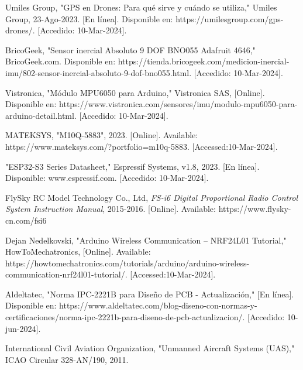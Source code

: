 \documentclass[journal,onecolumn]{IEEEtran}
\begin{document}
\begin{thebibliography}{20}
Umiles Group, "GPS en Drones: Para qué sirve y cuándo se utiliza," Umiles Group, 23-Ago-2023. [En línea]. Disponible en: https://umilesgroup.com/gps-drones/. [Accedido: 10-Mar-2024].

BricoGeek, "Sensor inercial Absoluto 9 DOF BNO055 Adafruit 4646," BricoGeek.com. Disponible en: https://tienda.bricogeek.com/medicion-inercial-imu/802-sensor-inercial-absoluto-9-dof-bno055.html. [Accedido: 10-Mar-2024].

Vistronica, "Módulo MPU6050 para Arduino," Vistronica SAS, [Online]. Disponible en: https://www.vistronica.com/sensores/imu/modulo-mpu6050-para-arduino-detail.html. [Accedido: 10-Mar-2024].

 MATEKSYS, "M10Q-5883", 2023. [Online]. Available: https://www.mateksys.com/?portfolio=m10q-5883. [Accessed:10-Mar-2024].


"ESP32-S3 Series Datasheet," Espressif Systems, v1.8, 2023. [En línea]. Disponible: www.espressif.com.  [Accedido: 10-Mar-2024].

FlySky RC Model Technology Co., Ltd, \emph{FS-i6 Digital Proportional Radio Control System Instruction Manual}, 2015-2016. [Online]. Available: https://www.flysky-cn.com/fsi6

 Dejan Nedelkovski, "Arduino Wireless Communication – NRF24L01 Tutorial," HowToMechatronics, [Online]. Available: https://howtomechatronics.com/tutorials/arduino/arduino-wireless-communication-nrf24l01-tutorial/. [Accessed:10-Mar-2024].




Aldeltatec, "Norma IPC-2221B para Diseño de PCB - Actualización," [En línea]. Disponible en: https://www.aldeltatec.com/blog-diseno-con-normas-y-certificaciones/norma-ipc-2221b-para-diseno-de-pcb-actualizacion/. [Accedido: 10-jun-2024].

 International Civil Aviation Organization, "Unmanned Aircraft Systems (UAS)," ICAO Circular 328-AN/190, 2011.

\end{thebibliography}


\end{document}
